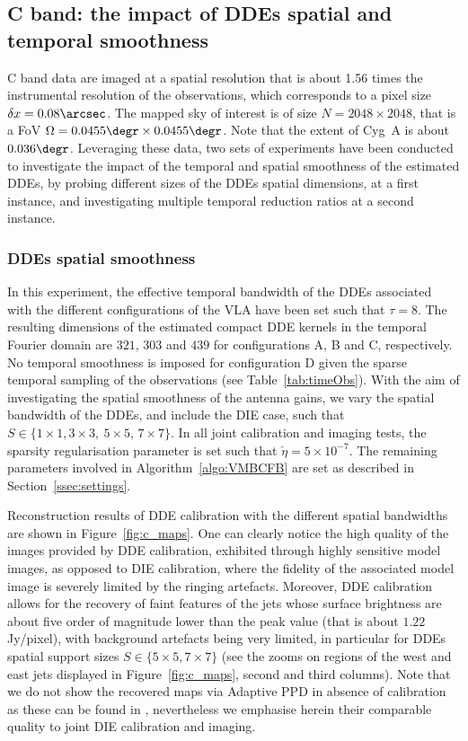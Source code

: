 \documentclass[fleqn,usenatbib]{mnras}
\begin{document}
\subsection{C band: the impact of DDEs spatial and temporal smoothness}
C band data are imaged at a spatial resolution that is about 1.56 times the instrumental resolution of the observations, which corresponds to a pixel size $\delta x=0.08\arcsec$. The mapped sky of interest is of size $N=2048\times 2048$, that is a FoV $\Omega= 0.0455\degr \times 0.0455\degr $. Note that the extent of Cyg~A is about $0.036\degr$. Leveraging these data, two sets of experiments have been conducted to investigate the impact of the temporal and spatial smoothness of the estimated DDEs, by probing different sizes of the DDEs spatial dimensions, at a first instance, and investigating multiple temporal reduction ratios at a second instance. 
\vspace*{-0.5cm}
\subsubsection*{DDEs spatial smoothness}
\label{sec:cyga-c}

In this experiment, the effective temporal bandwidth of the DDEs associated with the different configurations of the {{VLA}} have been set such that $\tau=8$. The resulting dimensions of the estimated compact DDE kernels in the temporal Fourier domain are $321$, $303$ and $439$ for configurations A, B and C, respectively. No temporal smoothness is imposed for configuration D given the sparse temporal sampling of the observations (see Table~\ref{tab:timeObs}). {{With the aim of investigating}} the spatial smoothness of the antenna gains, we vary the spatial bandwidth of the DDEs, and include the DIE case, such that $ S \in\{1\times 1,3\times 3,~5\times 5$, $7\times 7\}$.
In all joint calibration and imaging tests, the sparsity regularisation parameter is set such that $\check{\eta}=5\times10^{-7}$. The remaining parameters involved in Algorithm~\ref{algo:VMBCFB} are set as described in Section~\ref{ssec:settings}.

Reconstruction results of DDE calibration with the different spatial bandwidths are shown in Figure~\ref{fig:c_maps}. One can clearly notice the high quality of the images provided by DDE calibration, exhibited through highly sensitive model images, as opposed to DIE calibration, where the fidelity of the associated model image is severely limited by the ringing artefacts. Moreover, DDE calibration allows for the recovery of faint features of the jets whose surface brightness are about five order of magnitude lower than the peak value (that is about $1.22$ Jy/pixel), with background artefacts being very limited, in particular for DDEs spatial support sizes $S\in\{5\times 5, 7\times 7\}$ (see the zooms on regions of the west and east jets displayed in Figure~\ref{fig:c_maps}, second and third columns). Note that we do not show the recovered maps via Adaptive PPD in absence of calibration as these can be found in \citet{Dabbech2018}, nevertheless we emphasise herein their comparable quality to joint DIE calibration and imaging.
\end{document}
